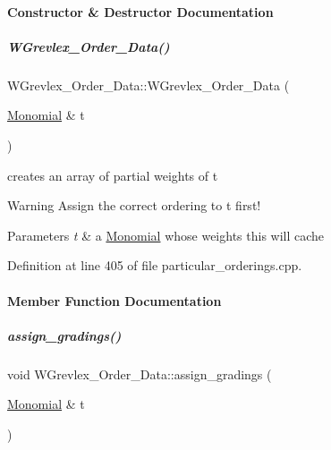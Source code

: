 \paragraph{Constructor \& Destructor Documentation}
\mbox{\label{group__orderinggroup_ad81bc55e04131b2d23371f6ce71d0422}} 
\subparagraph{\texorpdfstring{W\+Grevlex\+\_\+\+Order\+\_\+\+Data()}{WGrevlex\_Order\_Data()}}
{\footnotesize\ttfamily W\+Grevlex\+\_\+\+Order\+\_\+\+Data\+::\+W\+Grevlex\+\_\+\+Order\+\_\+\+Data (\begin{DoxyParamCaption}\item[{\hyperlink{group__polygroup_class_monomial}{Monomial} \&}]{t }\end{DoxyParamCaption})\hspace{0.3cm}{\ttfamily [explicit]}}



creates an array of partial weights of {\ttfamily t} 

\begin{DoxyWarning}{Warning}
Assign the correct ordering to {\ttfamily t} first! 
\end{DoxyWarning}

\begin{DoxyParams}{Parameters}
{\em t} & a \hyperlink{group__polygroup_class_monomial}{Monomial} whose weights {\ttfamily this} will cache \\
\hline
\end{DoxyParams}


Definition at line 405 of file particular\+\_\+orderings.\+cpp.



\paragraph{Member Function Documentation}
\mbox{\label{group__orderinggroup_a48f5464aaed30ba07d3eace69b2d87c1}} 
\subparagraph{\texorpdfstring{assign\+\_\+gradings()}{assign\_gradings()}}
{\footnotesize\ttfamily void W\+Grevlex\+\_\+\+Order\+\_\+\+Data\+::assign\+\_\+gradings (\begin{DoxyParamCaption}\item[{\hyperlink{group__polygroup_class_monomial}{Monomial} \&}]{t }\end{DoxyParamCaption})}



